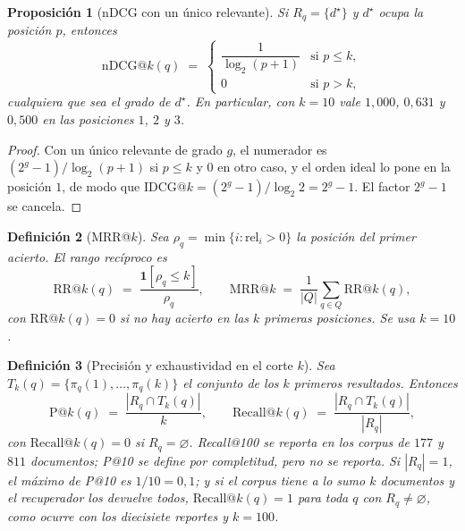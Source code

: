 \documentclass[11pt,letterpaper]{article}
\newtheorem{definition}{Definición}[section]
\newtheorem{proposition}[definition]{Proposición}
\numberwithin{equation}{section}
\begin{document}
\begin{proposition}[nDCG con un único relevante]
\label{prop:ndcg-unico}
Si $R_q=\{d^{\star}\}$ y $d^{\star}$ ocupa la posición $p$, entonces
\begin{equation}
\mathrm{nDCG@}k(q) \;=\;
\begin{cases}
\dfrac{1}{\log_2(p+1)} & \text{si } p\leq k,\\[2mm]
0 & \text{si } p>k ,
\end{cases}
\label{eq:g-ndcg-unico}
\end{equation}
cualquiera que sea el grado de $d^{\star}$. En particular, con $k=10$ vale $1{,}000$, $0{,}631$ y $0{,}500$ en las posiciones $1$, $2$ y $3$.
\end{proposition}
\begin{proof}
Con un único relevante de grado $g$, el numerador es $(2^{g}-1)/\log_2(p+1)$ si $p\leq k$ y $0$ en otro caso, y el orden ideal lo pone en la posición $1$, de modo que $\mathrm{IDCG@}k=(2^{g}-1)/\log_2 2=2^{g}-1$. El factor $2^{g}-1$ se cancela.
\end{proof}

\begin{definition}[MRR@$k$]
\label{def:mrr}
Sea $\rho_q=\min\{i:\mathrm{rel}_i>0\}$ la posición del primer acierto. El rango recíproco es
\begin{equation}
\mathrm{RR@}k(q) \;=\; \frac{\mathbf{1}[\rho_q\leq k]}{\rho_q},
\qquad
\mathrm{MRR@}k \;=\; \frac{1}{|Q|}\sum_{q\in Q}\mathrm{RR@}k(q),
\label{eq:g-mrr}
\end{equation}
con $\mathrm{RR@}k(q)=0$ si no hay acierto en las $k$ primeras posiciones. Se usa $k=10$.
\end{definition}

\begin{definition}[Precisión y exhaustividad en el corte $k$]
\label{def:prec-recall}
Sea $T_k(q)=\{\pi_q(1),\dots,\pi_q(k)\}$ el conjunto de los $k$ primeros resultados. Entonces
\begin{equation}
\mathrm{P@}k(q) \;=\; \frac{|R_q\cap T_k(q)|}{k},
\qquad
\mathrm{Recall@}k(q) \;=\; \frac{|R_q\cap T_k(q)|}{|R_q|},
\label{eq:g-prec-recall}
\end{equation}
con $\mathrm{Recall@}k(q)=0$ si $R_q=\varnothing$. Recall@100 se reporta en los corpus de $177$ y $811$ documentos; P@10 se define por completitud, pero no se reporta. Si $|R_q|=1$, el máximo de P@10 es $1/10=0{,}1$; y si el corpus tiene a lo sumo $k$ documentos y el recuperador los devuelve todos, $\mathrm{Recall@}k(q)=1$ para toda $q$ con $R_q\neq\varnothing$, como ocurre con los diecisiete reportes y $k=100$.
\end{definition}
\end{document}
